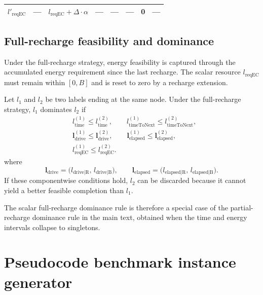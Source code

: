 \documentclass[3p,11pt,authoryear]{elsarticle}  %
\begin{document}
\begin{table}[!htbp]
{\begin{tabular}{@{}lccccccc@{}}
\( l'_{\text{reqEC}} \) 
& --- 
& \( l_{\text{reqEC}} + \Delta \cdot \alpha \) 
& --- 
& --- 
& --- 
& 0 
& --- \\

\bottomrule
\end{tabular}%
}
\end{table}


\subsection{Full-recharge feasibility and dominance}


Under the full-recharge strategy, energy feasibility is captured through the accumulated energy requirement since the last recharge. The scalar resource \(l_{\text{reqEC}}\) must remain within \([0,B]\) and is reset to zero by a recharge extension.

Let \(l_1\) and \(l_2\) be two labels ending at the same node. Under the full-recharge strategy, \(l_1\) dominates \(l_2\) if
\[
\begin{aligned}
&l_{\text{time}}^{(1)} \le l_{\text{time}}^{(2)},\qquad
l_{\text{timeToNext}}^{(1)} \le l_{\text{timeToNext}}^{(2)},\\
&\mathbf{l}_{\text{drive}}^{(1)} \le \mathbf{l}_{\text{drive}}^{(2)},\qquad
\mathbf{l}_{\text{elapsed}}^{(1)} \le \mathbf{l}_{\text{elapsed}}^{(2)},\\
&l_{\text{reqEC}}^{(1)} \le l_{\text{reqEC}}^{(2)}.
\end{aligned}
\]
where 
\[
\mathbf{l}_{\text{drive}}
=
\bigl(l_{\text{drive|R}},\,l_{\text{drive|B}}\bigr),
\qquad
\mathbf{l}_{\text{elapsed}}
=
\bigl(l_{\text{elapsed|R}},\,l_{\text{elapsed|B}}\bigr).
\]
If these componentwise conditions hold, \(l_2\) can be discarded because it cannot yield a better feasible completion than \(l_1\).

The scalar full-recharge dominance rule is therefore a special case of the partial-recharge dominance rule in the main text, obtained when the time and energy intervals collapse to singletons.



\newpage
\section{Pseudocode benchmark instance generator}
\end{document}
